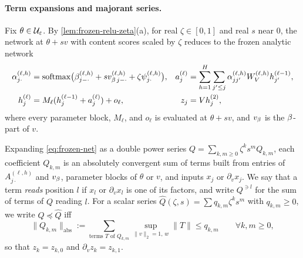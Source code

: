 \paragraph{Term expansions and majorant series.}
Fix $\theta \in \mathcal U_{\varepsilon}$. By \cref{lem:frozen-relu-zeta}(a), for real $\zeta \in [0,1]$ and real $s$ near $0$, the network at $\theta + s v$ with content scores scaled by $\zeta$ reduces to the frozen analytic network
\begin{align}
  \alpha_{j\cdot}^{(\ell,h)} &= \operatorname{softmax}\bigl(\beta_{j-\cdot}^{(\ell,h)} + s v_{\beta\,j-\cdot}^{(\ell,h)} + \zeta\psi_{j\cdot}^{(\ell,h)}\bigr), &
  a_j^{(\ell)} &= \sum_{h=1}^H \sum_{j'\le j} \alpha_{jj'}^{(\ell,h)} W_V^{(\ell,h)} h_{j'}^{(\ell-1)}, \nonumber\\
  h_j^{(\ell)} &= M_\ell(h_j^{(\ell-1)} + a_j^{(\ell)}) + o_\ell, &
  z_j &= V h_j^{(2)},
  \label{eq:frozen-net}
\end{align}
where every parameter block, $M_\ell$, and $o_\ell$ is evaluated at $\theta + sv$, and $v_\beta$ is the $\beta$-part of $v$.

Expanding \cref{eq:frozen-net} as a double power series $Q = \sum_{k,m\ge 0}\zeta^k s^m Q_{k,m}$, each coefficient $Q_{k,m}$ is an absolutely convergent sum of terms built from entries of $A_{j\cdot}^{(\ell,h)}$ and $v_\beta$, parameter blocks of $\theta$ or $v$, and inputs $x_j$ or $\partial_v x_j$. We say that a term \emph{reads} position $l$ if $x_l$ or $\partial_v x_l$ is one of its factors, and write $Q^{\ni l}$ for the sum of terms of $Q$ reading $l$. For a scalar series $\widehat Q(\zeta, s) = \sum q_{k,m}\zeta^k s^m$ with $q_{k,m} \ge 0$, we write $Q \preccurlyeq \widehat Q$ iff
\[
  \|Q_{k,m}\|_{\mathrm{abs}} := \sum_{\text{terms } T \text{ of } Q_{k,m}} \sup_{\|v\|_2=1,\, w} \|T\| \le q_{k,m} \qquad \forall k, m \ge 0,
\]
so that $z_k = z_{k,0}$ and $\partial_v z_k = z_{k,1}$.

